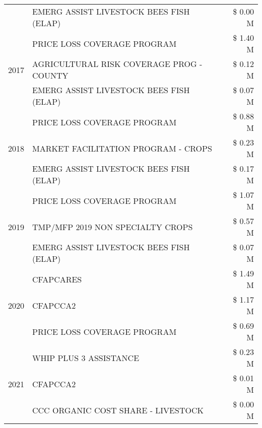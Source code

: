 \begin{tabular}{llr}
 & EMERG ASSIST LIVESTOCK BEES FISH (ELAP) & \$ 0.00 M \\
\cline{1-3}
\multirow[t]{3}{*}{2017} & PRICE LOSS COVERAGE PROGRAM & \$ 1.40 M \\
 & AGRICULTURAL RISK COVERAGE PROG - COUNTY & \$ 0.12 M \\
 & EMERG ASSIST LIVESTOCK BEES FISH (ELAP) & \$ 0.07 M \\
\cline{1-3}
\multirow[t]{3}{*}{2018} & PRICE LOSS COVERAGE PROGRAM & \$ 0.88 M \\
 & MARKET FACILITATION PROGRAM - CROPS & \$ 0.23 M \\
 & EMERG ASSIST LIVESTOCK BEES FISH (ELAP) & \$ 0.17 M \\
\cline{1-3}
\multirow[t]{3}{*}{2019} & PRICE LOSS COVERAGE PROGRAM & \$ 1.07 M \\
 & TMP/MFP 2019 NON SPECIALTY CROPS & \$ 0.57 M \\
 & EMERG ASSIST LIVESTOCK BEES FISH (ELAP) & \$ 0.07 M \\
\cline{1-3}
\multirow[t]{3}{*}{2020} & CFAPCARES & \$ 1.49 M \\
 & CFAPCCA2 & \$ 1.17 M \\
 & PRICE LOSS COVERAGE PROGRAM & \$ 0.69 M \\
\cline{1-3}
\multirow[t]{3}{*}{2021} & WHIP PLUS 3 ASSISTANCE & \$ 0.23 M \\
 & CFAPCCA2 & \$ 0.01 M \\
 & CCC ORGANIC COST SHARE - LIVESTOCK & \$ 0.00 M \\
\cline{1-3}
\bottomrule
\end{tabular}
